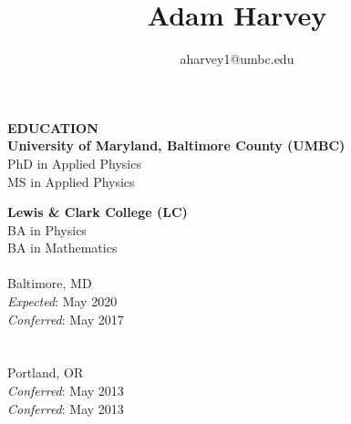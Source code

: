 \documentclass{article}
\begin{document}
\singlespacing



\title{Adam Harvey}
\author{aharvey1@umbc.edu}


\maketitle
\begin{vwcol}[widths={0.8,0.2}, sep=.8cm, justify=flush, rule=0pt, indent=0em]
\noindent\textbf{EDUCATION}\\
\textbf{University of Maryland, Baltimore County (UMBC)}\\
PhD in Applied Physics\\
MS in Applied Physics\\
\par
\textbf{Lewis \& Clark College (LC)}\\
BA in Physics\\
BA in Mathematics\\
\newpage
\phantom \\
\noindent Baltimore, MD\\
\emph{Expected}: May 2020\\
\emph{Conferred}: May 2017\\
\\
\\
Portland, OR\\
\emph{Conferred}: May 2013\\
\emph{Conferred}: May 2013
\end{vwcol}
\phantom \\
\end{document}

